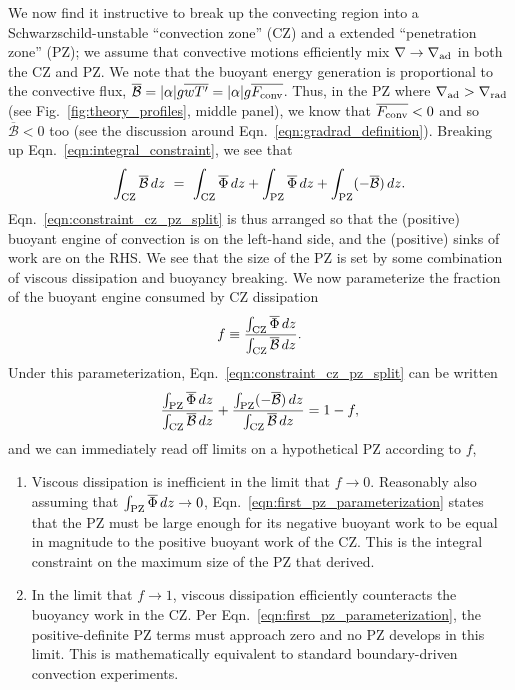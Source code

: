 \documentclass[twocolumn]{aastex631}
\newcommand{\gradrad}{\ensuremath{\nabla_{\rm{rad}}}}
\newcommand{\gradad}{\ensuremath{\nabla_{\rm{ad}}}}
\newcommand{\justgrad}{\ensuremath{\nabla}}
\newcommand{\Fconv}{\ensuremath{F_{\rm{conv}}}}
\renewcommand{\bar}[1]{\overline{#1}}
\begin{document}
We now find it instructive to break up the convecting region into a Schwarzschild-unstable ``convection zone'' (CZ) and a extended ``penetration zone'' (PZ); we assume that convective motions efficiently mix $\justgrad \rightarrow \gradad$ in both the CZ and PZ.
We note that the buoyant energy generation is proportional to the convective flux, $\bar{\mathcal{B}} = |\alpha|g\bar{w T'} = |\alpha| g \bar{\Fconv}$.
Thus, in the PZ where $\gradad > \gradrad$ (see Fig.~\ref{fig:theory_profiles}, middle panel), we know that $\bar{\Fconv} < 0$ and so $\bar{\mathcal{B}} < 0$ too (see the discussion around Eqn.~\ref{eqn:gradrad_definition}).
Breaking up Eqn.~\ref{eqn:integral_constraint}, we see that
\begin{equation}
\int_{\rm{CZ}} \bar{\mathcal{B}}\,dz \,\,=\,\,
\int_{\rm{CZ}} \bar{\Phi}\,dz + \int_{\rm{PZ}} \bar{\Phi}\,dz + \int_{\rm{PZ}}(-\bar{\mathcal{B}})\,dz.
\label{eqn:constraint_cz_pz_split}
\end{equation}
Eqn.~\ref{eqn:constraint_cz_pz_split} is thus arranged so that the (positive) buoyant engine of convection is on the left-hand side, and the (positive) sinks of work are on the RHS.
We see that the size of the PZ is set by some combination of viscous dissipation and buoyancy breaking.
We now parameterize the fraction of the buoyant engine consumed by CZ dissipation  
\begin{equation}
f \equiv \frac{\int_{\rm{CZ}} \bar{\Phi}\,dz}{\int_{\rm{CZ}}\bar{\mathcal{B}}\,dz}.
\label{eqn:f_defn}
\end{equation}
Under this parameterization, Eqn.~\ref{eqn:constraint_cz_pz_split} can be written
\begin{equation}
\frac{\int_{\rm{PZ}} \bar{\Phi}\,dz }{\int_{\rm{CZ}} \bar{\mathcal{B}}\,dz}
+ \frac{\int_{\rm{PZ}}(-\bar{\mathcal{B}})\,dz}{\int_{\rm{CZ}} \bar{\mathcal{B}}\,dz}
= 1 - f,
\label{eqn:first_pz_parameterization}
\end{equation}
and we can immediately read off limits on a hypothetical PZ according to $f$,
\begin{enumerate}
\item Viscous dissipation is inefficient in the limit that $f \rightarrow 0$.
Reasonably also assuming that $\int_{\rm{PZ}}\bar{\Phi}\,dz \rightarrow 0$, Eqn.~\ref{eqn:first_pz_parameterization} states that the PZ must be large enough for its negative buoyant work to be equal in magnitude to the positive buoyant work of the CZ.
This is the integral constraint on the maximum size of the PZ that \citet{roxburgh1989} derived.
\item In the limit that $f \rightarrow 1$, viscous dissipation efficiently counteracts the buoyancy work in the CZ.
Per Eqn.~\ref{eqn:first_pz_parameterization}, the positive-definite PZ terms must approach zero and no PZ develops in this limit.
This is mathematically equivalent to standard boundary-driven convection experiments.
\end{enumerate}
\end{document}
